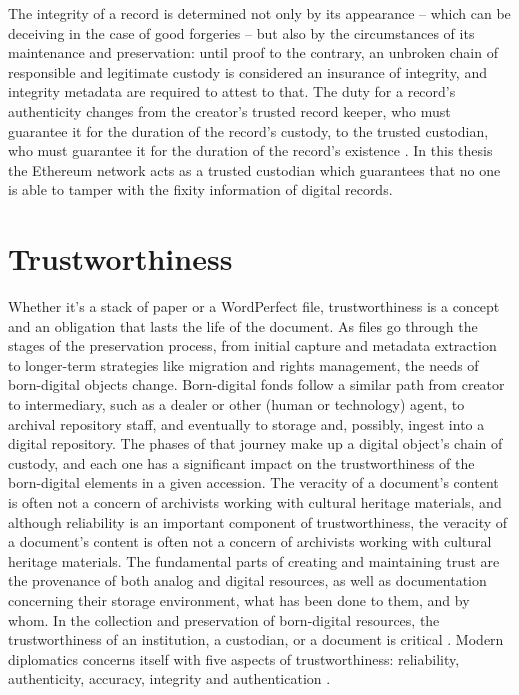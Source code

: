 The integrity of a record is determined not only by its appearance – which can be deceiving in the case of good forgeries – but also by the circumstances of its maintenance and preservation: until proof to the contrary, an unbroken chain of responsible and legitimate custody is considered an insurance of integrity, and integrity metadata are required to attest to that. The duty for a record's authenticity changes from the creator's trusted record keeper, who must guarantee it for the duration of the record's custody, to the trusted custodian, who must guarantee it for the duration of the record's existence \cite[53]{duranti2009digital}. In this thesis the Ethereum network acts as a trusted custodian which guarantees that no one is able to tamper with the fixity information of digital records.

\section{Trustworthiness}
Whether it's a stack of paper or a WordPerfect file, trustworthiness is a concept and an obligation that lasts the life of the document. As files go through the stages of the preservation process, from initial capture and metadata extraction to longer-term strategies like migration and rights management, the needs of born-digital objects change. Born-digital fonds follow a similar path from creator to intermediary, such as a dealer or other (human or technology) agent, to archival repository staff, and eventually to storage and, possibly, ingest into a digital repository.
The phases of that journey make up a digital object's chain of custody, and each one has a significant impact on the trustworthiness of the born-digital elements in a given accession. The veracity of a document's content is often not a concern of archivists working with cultural heritage materials, and although reliability is an important component of trustworthiness, the veracity of a document's content is often not a concern of archivists working with cultural heritage materials. The fundamental parts of creating and maintaining trust are the provenance of both analog and digital resources, as well as documentation concerning their storage environment, what has been done to them, and by whom. In the collection and preservation of born-digital resources, the trustworthiness of an institution, a custodian, or a document is critical \cite[27]{kirschenbaum2010digital}. 
Modern diplomatics concerns itself with five aspects of trustworthiness: reliability, authenticity, accuracy, integrity and authentication \cite[10]{kirschenbaum2010digital}.

